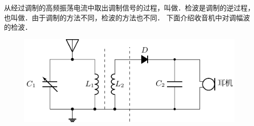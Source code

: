 从经过调制的高频振荡电流中取出调制信号的过程，叫做．检波是调制的逆过程，也叫做．由于调制的方法不同，检波的方法也不同．
下面介绍收音机中对调幅波的检波．
\begin{figure}[htbp]
    \centering
    \includegraphics{fig/C/4-18.pdf}
    \caption{}\label{fig_C_4-18}
\end{figure}

